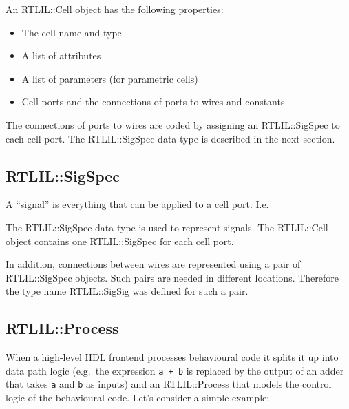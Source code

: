 An RTLIL::Cell object has the following properties:

\begin{itemize}
\item The cell name and type
\item A list of attributes
\item A list of parameters (for parametric cells)
\item Cell ports and the connections of ports to wires and constants
\end{itemize}

The connections of ports to wires are coded by assigning an RTLIL::SigSpec
to each cell port. The RTLIL::SigSpec data type is described in the next section.

\subsection{RTLIL::SigSpec}

A ``signal'' is everything that can be applied to a cell port. I.e.


The RTLIL::SigSpec data type is used to represent signals. The RTLIL::Cell
object contains one RTLIL::SigSpec for each cell port.

In addition, connections between wires are represented using a pair of
RTLIL::SigSpec objects. Such pairs are needed in different locations. Therefore
the type name RTLIL::SigSig was defined for such a pair.

\subsection{RTLIL::Process}

When a high-level HDL frontend processes behavioural code it splits it up into
data path logic (e.g.~the expression {\tt a + b} is replaced by the output of an
adder that takes {\tt a} and {\tt b} as inputs) and an RTLIL::Process that models
the control logic of the behavioural code. Let's consider a simple example:

